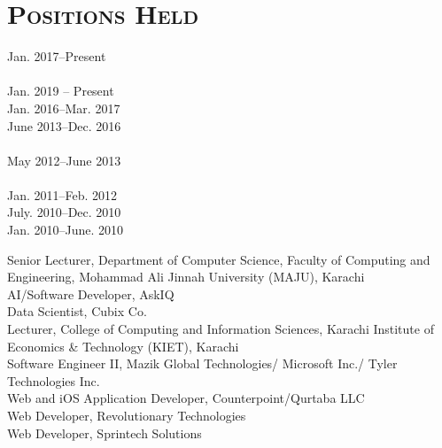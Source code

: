 \documentclass[a4paper, 10pt]{article}
\begin{document}
\section*{\normalfont\textsc{Positions Held}}
\hfill\begin{minipage}{0.23\textwidth}
Jan. 2017--Present\textcolor{lightgray}{\dotfill}\\\\
Jan. 2019 -- Present \textcolor{lightgray}{\dotfill}\\
Jan. 2016--Mar. 2017\textcolor{lightgray}{\dotfill}\\
June 2013--Dec. 2016\textcolor{lightgray}{\dotfill}\\\\
May 2012--June 2013\textcolor{lightgray}{\dotfill}\\\\
Jan. 2011--Feb. 2012\textcolor{lightgray}{\dotfill}\\
July. 2010--Dec. 2010\textcolor{lightgray}{\dotfill}\\
Jan. 2010--June. 2010\textcolor{lightgray}{\dotfill}
\end{minipage}
\begin{minipage}{0.75\textwidth}
Senior Lecturer, Department of Computer Science, Faculty of Computing and Engineering, Mohammad Ali Jinnah University (MAJU), Karachi\\
AI/Software Developer, AskIQ\\
Data Scientist, Cubix Co.\\
Lecturer, College of Computing and Information Sciences, Karachi Institute of Economics \& Technology (KIET), Karachi\\
Software Engineer II, Mazik Global Technologies/ Microsoft Inc./ Tyler Technologies Inc.\\
Web and iOS Application Developer, Counterpoint/Qurtaba LLC\\
Web Developer, Revolutionary Technologies\\
Web Developer, Sprintech Solutions
\end{minipage}

\end{document}
